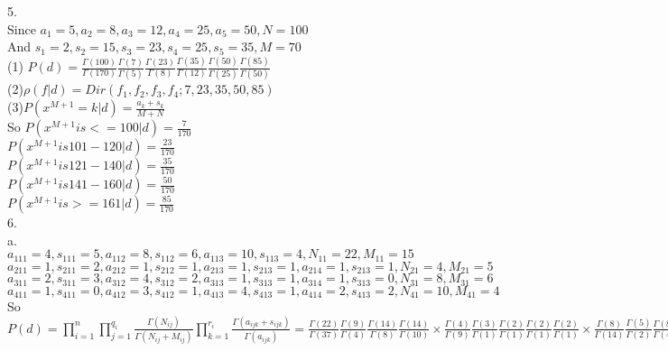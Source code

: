 \documentclass[a4paper]{article}
\begin{document}
5. \\
Since $a_1=5, a_2=8, a_3=12, a_4=25, a_5=50, N=100$\\
And $s_1=2, s_2=15, s_3=23, s_4=25, s_5=35, M=70$\\
(1) $P(d)=\frac{\Gamma(100)}{\Gamma(170)}\frac{\Gamma(7)}{\Gamma(5)}\frac{\Gamma(23)}{\Gamma(8)}\frac{\Gamma(35)}{\Gamma(12)}\frac{\Gamma(50)}{\Gamma(25)}\frac{\Gamma(85)}{\Gamma(50)}$\\
(2)$\rho(f|d)=Dir(f_1, f_2, f_3, f_4;7, 23, 35, 50, 85)$\\
(3)$P(x^{M+1}=k|d)=\frac{a_k+s_k}{M+N}$\\
So $P(x^{M+1}is <= 100|d)=\frac{7}{170}$\\
$P(x^{M+1}is 101-120|d)=\frac{23}{170}$\\
$P(x^{M+1}is 121-140|d)=\frac{35}{170}$\\
$P(x^{M+1}is 141-160|d)=\frac{50}{170}$\\
$P(x^{M+1}is >= 161|d)=\frac{85}{170}$\\

6. \\
a.\\
$a_{111}=4, s_{111}=5, a_{112}=8, s_{112}=6, a_{113}=10, s_{113}=4, N_{11}=22, M_{11}=15$\\
$a_{211}=1, s_{211}=2, a_{212}=1, s_{212}=1, a_{213}=1, s_{213}=1, a_{214}=1, s_{213}=1, N_{21}=4, M_{21}=5$\\
$a_{311}=2, s_{311}=3, a_{312}=4, s_{312}=2, a_{313}=1, s_{313}=1, a_{314}=1, s_{313}=0, N_{31}=8, M_{31}=6$\\
$a_{411}=1, s_{411}=0, a_{412}=3, s_{412}=1, a_{413}=4, s_{413}=1, a_{414}=2, s_{413}=2, N_{41}=10, M_{41}=4$\\
So $P(d)=\prod\limits_{i=1}^{n} \prod\limits_{j=1}^{q_i} \frac{\Gamma(N_{ij})}{\Gamma(N_{ij}+M_{ij})} \prod\limits_{k=1}^{r_i} \frac{\Gamma(a_{ijk}+s_{ijk})}{\Gamma(a_{ijk})}=\frac{\Gamma(22)}{\Gamma(37)}\frac{\Gamma(9)}{\Gamma(4)}\frac{\Gamma(14)}{\Gamma(8)}\frac{\Gamma(14)}{\Gamma(10)} \times \frac{\Gamma(4)}{\Gamma(9)}\frac{\Gamma(3)}{\Gamma(1)}\frac{\Gamma(2)}{\Gamma(1)}\frac{\Gamma(2)}{\Gamma(1)}\frac{\Gamma(2)}{\Gamma(1)} \times \frac{\Gamma(8)}{\Gamma(14)}\frac{\Gamma(5)}{\Gamma(2)}\frac{\Gamma(8)}{\Gamma(4)}\frac{\Gamma(6)}{\Gamma(1)}\frac{\Gamma(1)}{\Gamma(1)} \times \frac{\Gamma(10)}{\Gamma(14)}\frac{\Gamma(1)}{\Gamma(1)}\frac{\Gamma(4)}{\Gamma(3)}\frac{\Gamma(5)}{\Gamma(4)}\frac{\Gamma(4)}{\Gamma(2)}$\\
\end{document}
